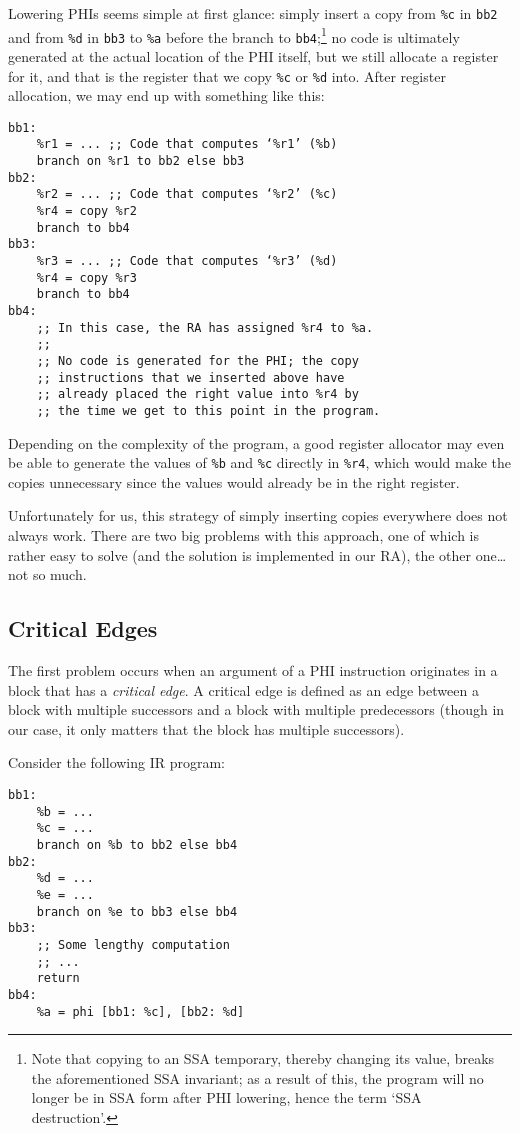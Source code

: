 \documentclass[12pt]{report}
\begin{document}
Lowering PHIs seems simple at first glance: simply insert a copy from \verb|%c| in \verb|bb2| and from \verb|%d| in \verb|bb3| to
\verb|%a| before the branch to \verb|bb4|;\footnote{Note that copying to an SSA temporary, thereby changing its value, breaks the
aforementioned SSA invariant; as a result of this, the program will no longer be in SSA form after PHI lowering, hence the term ‘SSA
destruction’.} no code is ultimately generated at the actual location of the PHI itself, but we
still allocate a register for it, and that is the register that we copy \verb|%c| or \verb|%d| into. After register allocation, we may
end up with something like this:
\begin{Verbatim}
bb1:
    %r1 = ... ;; Code that computes ‘%r1’ (%b)
    branch on %r1 to bb2 else bb3
bb2:
    %r2 = ... ;; Code that computes ‘%r2’ (%c)
    %r4 = copy %r2
    branch to bb4
bb3:
    %r3 = ... ;; Code that computes ‘%r3’ (%d)
    %r4 = copy %r3
    branch to bb4
bb4:
    ;; In this case, the RA has assigned %r4 to %a.
    ;;
    ;; No code is generated for the PHI; the copy
    ;; instructions that we inserted above have
    ;; already placed the right value into %r4 by
    ;; the time we get to this point in the program.
\end{Verbatim}

\noindent Depending on the complexity of the program, a good register allocator may even be able to generate the values of \verb|%b| and
\verb|%c| directly in \verb|%r4|, which would make the copies unnecessary since the values would already be in the right register.

Unfortunately for us, this strategy of simply inserting copies everywhere does not always work. There are two big problems with this
approach, one of which is rather easy to solve (and the solution is implemented in our RA), the other one\ldots{} not so much.

\subsection{Critical Edges}
The first problem occurs when an argument of a PHI instruction originates in a block that has a \textit{critical edge}. A critical edge is
defined as an edge between a block with multiple successors and a block with multiple predecessors (though in our case, it only matters
that the block has multiple successors).

Consider the following IR program:
\begin{Verbatim}
bb1:
    %b = ...
    %c = ...
    branch on %b to bb2 else bb4
bb2:
    %d = ...
    %e = ...
    branch on %e to bb3 else bb4
bb3:
    ;; Some lengthy computation
    ;; ...
    return
bb4:
    %a = phi [bb1: %c], [bb2: %d]
\end{Verbatim}
\end{document}
